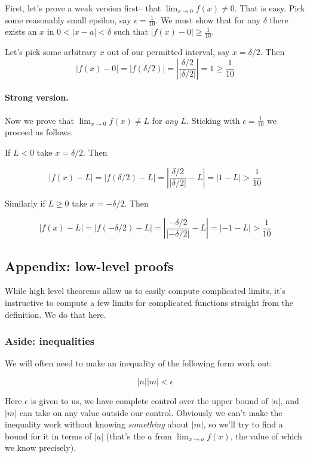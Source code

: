 First, let's prove a weak version first-- that
$\lim_{x\to 0}f(x)\neq 0$. That is easy. Pick some reasonably small
epsilon, say $\epsilon=\frac{1}{10}$. We must show that for any
$\delta$ there exists an $x$ in $0<|x-a|<\delta$ such that
$|f(x)-0|\geq \frac{1}{10}$.

\vs

Let's pick some arbitrary $x$ out of our permitted interval, say $x=\delta/2$. Then
\[|f(x)-0|=|f(\delta/2)|=\left|\frac{\delta/2}{|\delta/2|}\right|=1\geq\frac{1}{10}\]


\paragraph{Strong version.}

Now we prove that $\lim_{x\to 0}f(x)\neq L$ for \textit{any} $L$. Sticking
with $\epsilon=\frac{1}{10}$ we proceed as follows.

\vs

If $L<0$ take $x=\delta/2$. Then

\[|f(x)-L|=|f(\delta/2)-L|=\left|\frac{\delta/2}{|\delta/2|}-L\right|=|1-L|>\frac{1}{10}\]

Similarly if $L\geq 0$ take $x=-\delta/2$. Then

\[|f(x)-L|=|f(-\delta/2)-L|=\left|\frac{-\delta/2}{|-\delta/2|}-L\right|=|-1-L|>\frac{1}{10}\]

\subsection{Appendix: low-level proofs}

While high level theorems allow us to easily compute complicated
limits, it's instructive to compute a few limits for complicated
functions straight from the definition. We do that here.

\subsubsection*{Aside: inequalities}

We will often need to make an inequality of the following form work out:

\[|n||m|<\epsilon\]

Here $\epsilon$ is given to us, we have complete control over the upper bound
of $|n|$, and $|m|$ can take on any value outside our control.
Obviously we can't make the inequality work without knowing
\textit{something} about $|m|$, so we'll try to find a bound for it in
terms of $|a|$ (that's the $a$ from $\lim_{x\to a}f(x)$, the value of
which we know precisely).

